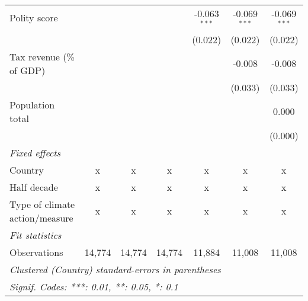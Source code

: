 \begin{tabular}{lcccccc}
   Polity score                                              &              &              &               & -0.063$^{***}$ & -0.069$^{***}$ & -0.069$^{***}$\\   
                                                             &              &              &               & (0.022)        & (0.022)        & (0.022)\\   
   Tax revenue (\% of GDP)                                   &              &              &               &                & -0.008         & -0.008\\   
                                                             &              &              &               &                & (0.033)        & (0.033)\\   
   Population total                                          &              &              &               &                &                & 0.000\\   
                                                             &              &              &               &                &                & (0.000)\\   
   \emph{Fixed effects}\\
   Country                                                   & x            & x            & x             & x              & x              & x\\  
   Half decade                                               & x            & x            & x             & x              & x              & x\\  
   Type of climate action/measure                            & x            & x            & x             & x              & x              & x\\  
   \midrule \emph{Fit statistics}\\
   Observations                                              & 14,774       & 14,774       & 14,774        & 11,884         & 11,008         & 11,008\\  
   \midrule
   \multicolumn{7}{l}{\emph{Clustered (Country) standard-errors in parentheses}}\\
   \multicolumn{7}{l}{\emph{Signif. Codes: ***: 0.01, **: 0.05, *: 0.1}}\\
\end{tabular}
\par\endgroup


